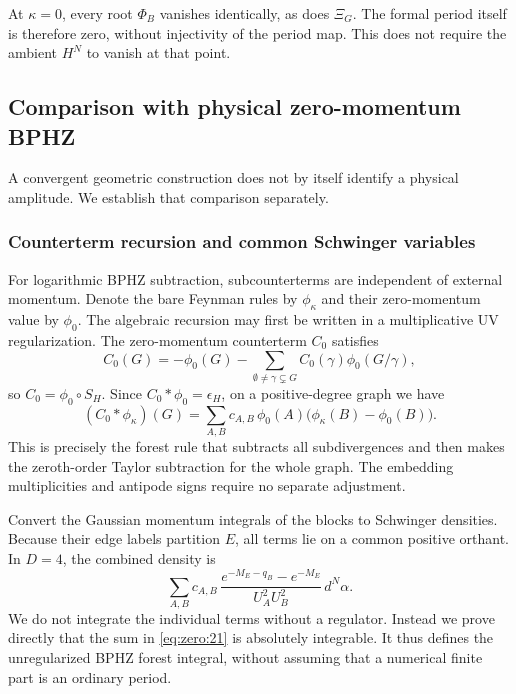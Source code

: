 \documentclass[11pt,a4paper,oneside]{article}
\theoremstyle{plain}
\theoremstyle{definition}
\theoremstyle{remark}
\numberwithin{equation}{section}
\begin{document}
At \(\kappa=0\), every root \(\Phi_B\) vanishes identically, as does \(\Xi_G\). The formal period itself is therefore zero, without injectivity of the period map. This does not require the ambient \(H^N\) to vanish at that point.

\subsection{Comparison with physical zero-momentum BPHZ}\label{sec:zero:8}
A convergent geometric construction does not by itself identify a physical amplitude. We establish that comparison separately.

\subsubsection{Counterterm recursion and common Schwinger variables}\label{sec:zero:8.1}
For logarithmic BPHZ subtraction, subcounterterms are independent of external momentum. Denote the bare Feynman rules by $\phi_\kappa$ and their zero-momentum value by $\phi_0$. The algebraic recursion may first be written in a multiplicative UV regularization. The zero-momentum counterterm $C_0$ satisfies
\begin{equation}
C_0(G)=-\phi_0(G)-\sum_{\emptyset\ne\gamma\subsetneq G}
                                C_0(\gamma)\phi_0(G/\gamma),
\end{equation}
so $C_0=\phi_0\circ S_H$. Since $C_0*\phi_0=\epsilon_H$, on a positive-degree graph we have
\begin{equation}
(C_0*\phi_\kappa)(G)
   =\sum_{A,B}c_{A,B}\,
                  \phi_0(A)\bigl(\phi_\kappa(B)-\phi_0(B)\bigr).       \label{eq:zero:20}
\end{equation}
This is precisely the forest rule that subtracts all subdivergences and then makes the zeroth-order Taylor subtraction for the whole graph. The embedding multiplicities and antipode signs require no separate adjustment.

Convert the Gaussian momentum integrals of the blocks to Schwinger densities. Because their edge labels partition $E$, all terms lie on a common positive orthant. In \(D=4\), the combined density is
\begin{equation}
\sum_{A,B}c_{A,B}\,
 \frac{e^{-M_E-q_B}-e^{-M_E}}{U_A^2U_B^2}\,d^N\alpha.          \label{eq:zero:21}
\end{equation}
We do not integrate the individual terms without a regulator. Instead we prove directly that the sum in \eqref{eq:zero:21} is absolutely integrable. It thus defines the unregularized BPHZ forest integral, without assuming that a numerical finite part is an ordinary period.
\end{document}
